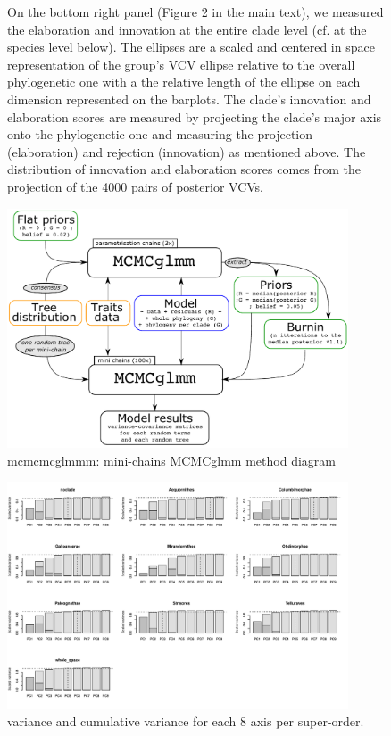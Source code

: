 \documentclass[12pt,letterpaper]{article}
\begin{document}
\begin{figure}[!htbp]
{On the bottom right panel (Figure 2 in the main text), we measured the elaboration and innovation at the entire clade level (cf. at the species level below).
The ellipses are a scaled and centered in space representation of the group’s VCV ellipse relative to the overall phylogenetic one with a the relative length of the ellipse on each dimension represented on the barplots.
The clade's innovation and elaboration scores are measured by projecting the clade's major axis onto the phylogenetic one and measuring the projection (elaboration) and rejection (innovation) as mentioned above.
The distribution of innovation and elaboration scores comes from the projection of the 4000 pairs of posterior VCVs.}

\label{Fig:cheat_sheet}
\end{figure}

\begin{figure}[htbp]
\centering
   \includegraphics[width=0.9\textwidth]{Figures/mini-chains_diagram.pdf}
\caption{mcmcmcglmmm: mini-chains MCMCglmm method diagram}
\label{Fig:mcmcmcglmm}
\end{figure}

\begin{figure}[htbp]
\centering
   \includegraphics[width=0.9\textwidth]{Figures/axis_selection.pdf}
\caption{variance and cumulative variance for each 8 axis per super-order.}
\label{Fig:axes_variance}
\end{figure}
\end{document}
